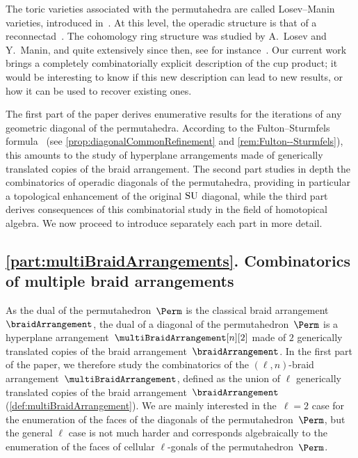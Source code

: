 The toric varieties associated with the permutahedra are called Losev--Manin varieties, introduced in~\cite{LosevManin}.
At this level, the operadic structure is that of a reconnectad~\cite{DotsenkoKeilthyLyskov}. 
The cohomology ring structure was studied by A.~Losev and Y.~Manin, and quite extensively since then, see for instance~\cite{BergstromMinabe, Lin}. 
Our current work brings a completely combinatorially explicit description of the cup product; it would be interesting to know if this new description can lead to new results, or how it can be used to recover existing ones.

The first part of the paper derives enumerative results for the iterations of any geometric diagonal of the permutahedra. 
According to the Fulton--Sturmfels formula~\cite{FultonSturmfels} (see \cref{prop:diagonalCommonRefinement} and \cref{rem:Fulton--Sturmfels}), this amounts to the study of hyperplane arrangements made of generically translated copies of the braid arrangement.
The second part studies in depth the combinatorics of operadic diagonals of the permutahedra, providing in particular a topological enhancement of the original $\mathrm{SU}$ diagonal, while the third part derives consequences of this combinatorial study in the field of homotopical algebra.
We now proceed to introduce separately each part in more detail.


\subsection*{\cref{part:multiBraidArrangements}. Combinatorics of multiple braid arrangements}

As the dual of the permutahedron~$\Perm$ is the classical braid arrangement~$\braidArrangement$, the dual of a diagonal of the permutahedron~$\Perm$ is a hyperplane arrangement~$\multiBraidArrangement[n][2]$ made of $2$ generically translated copies of the braid arrangement~$\braidArrangement$.
In the first part of the paper, we therefore study the combinatorics of the $(\ell,n)$-braid arrangement~$\multiBraidArrangement$, defined as the union of $\ell$ generically translated copies of the braid arrangement~$\braidArrangement$ (\cref{def:multiBraidArrangement}).
We are mainly interested in the~$\ell = 2$ case for the enumeration of the faces of the diagonals of the permutahedron~$\Perm$, but the general $\ell$ case is not much harder and corresponds algebraically to the enumeration of the faces of cellular $\ell$-gonals of the permutahedron~$\Perm$.


